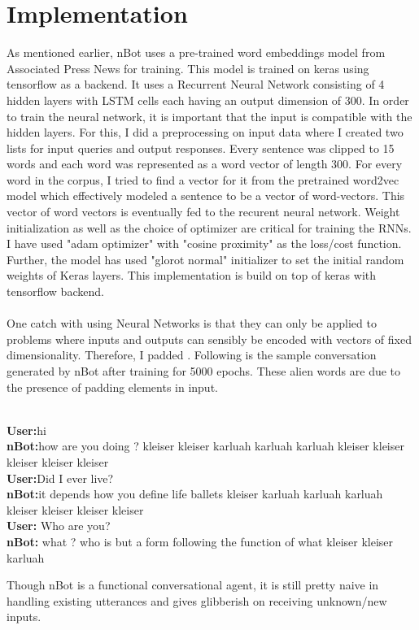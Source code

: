 \documentclass[letterpaper] {article} %
\begin{document}
\section{Implementation}
As mentioned earlier, nBot uses a pre-trained word embeddings model from Associated Press News for training. This model is trained on keras using tensorflow as a backend. It uses a Recurrent Neural Network consisting of 4 hidden layers with LSTM cells each having an output dimension of 300. In order to train the neural network, it is important that the input is compatible with the hidden layers. For this, I did a preprocessing on input data where I created two lists for input queries and output responses. Every sentence was clipped to 15 words and each word was represented as a word vector of length 300. For every word in the corpus, I tried to find a vector for it from the pretrained word2vec model which effectively modeled a sentence to be a vector of word-vectors. This vector of word vectors is eventually fed to the recurent neural network. Weight initialization as well as the choice of optimizer are critical for training the RNNs. I have used "adam optimizer" with "cosine proximity" as the loss/cost function. Further, the model has used "glorot normal" initializer to set the initial random weights of Keras layers. This implementation is build on top of keras with tensorflow backend.
\\\\
One catch with using Neural Networks is that they can only be applied to problems where inputs and outputs can sensibly be encoded with vectors of fixed dimensionality. Therefore, I padded . Following is the sample conversation generated by nBot after training for 5000 epochs. These alien words are due to the presence of padding elements in input.\\\\
	\begin{tcolorbox}
	\textbf{User:}hi \\
	\textbf{nBot:}how are you doing ? kleiser kleiser karluah karluah karluah kleiser kleiser kleiser kleiser kleiser \\
	\textbf{User:}Did I ever live?\\
	\textbf{nBot:}it depends how you define life ballets kleiser karluah karluah karluah kleiser kleiser kleiser kleiser\\
	\textbf{User:} Who are you?\\
	\textbf{nBot:} what ? who is but a form following the function of what kleiser kleiser karluah\\
	\end{tcolorbox}
Though nBot is a functional conversational agent, it is still pretty naive in handling existing utterances and gives glibberish on receiving unknown/new inputs. 
\end{document}
